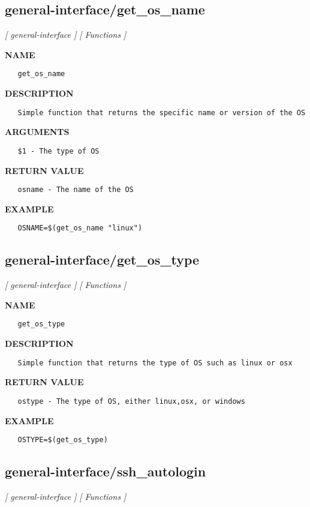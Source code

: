 \subsection{general-interface/get\_os\_name}
\textsl{[ general-interface ]}
\textsl{[ Functions ]}

\label{ch:robo36}
\label{ch:general_interface_get_os_name}
\textbf{NAME}
\begin{verbatim}
   get_os_name
\end{verbatim}
\textbf{DESCRIPTION}
\begin{verbatim}
   Simple function that returns the specific name or version of the OS
\end{verbatim}
\textbf{ARGUMENTS}
\begin{verbatim}
   $1 - The type of OS
\end{verbatim}
\textbf{RETURN VALUE}
\begin{verbatim}
   osname - The name of the OS
\end{verbatim}
\textbf{EXAMPLE}
\begin{verbatim}
   OSNAME=$(get_os_name "linux")
\end{verbatim}
\newpage
\subsection{general-interface/get\_os\_type}
\textsl{[ general-interface ]}
\textsl{[ Functions ]}

\label{ch:robo37}
\label{ch:general_interface_get_os_type}
\textbf{NAME}
\begin{verbatim}
   get_os_type
\end{verbatim}
\textbf{DESCRIPTION}
\begin{verbatim}
   Simple function that returns the type of OS such as linux or osx
\end{verbatim}
\textbf{RETURN VALUE}
\begin{verbatim}
   ostype - The type of OS, either linux,osx, or windows
\end{verbatim}
\textbf{EXAMPLE}
\begin{verbatim}
   OSTYPE=$(get_os_type)
\end{verbatim}
\newpage
\subsection{general-interface/ssh\_autologin}
\textsl{[ general-interface ]}
\textsl{[ Functions ]}


